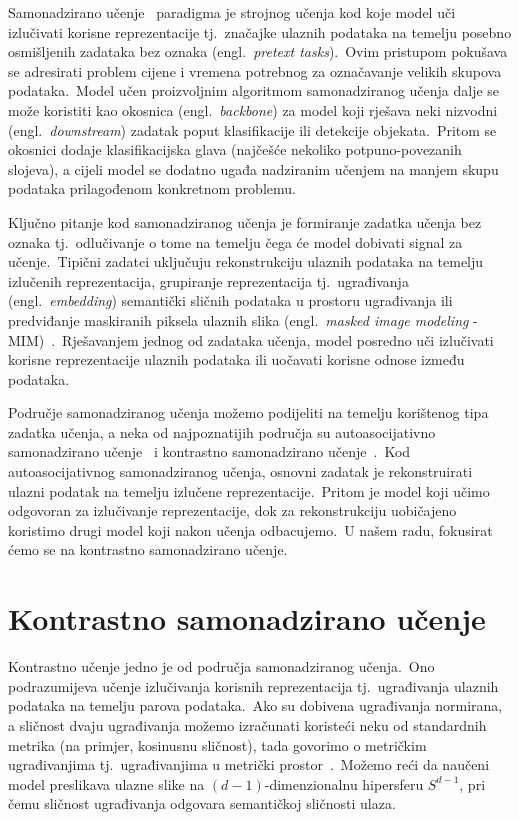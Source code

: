 \documentclass[diplomskirad]{fer}
\begin{document}
Samonadzirano učenje~\cite{jaiswal2020survey} paradigma je strojnog učenja kod koje model uči izlučivati korisne reprezentacije tj.\ značajke ulaznih podataka na temelju posebno osmišljenih zadataka bez oznaka (engl.\ \textit{pretext tasks}).\ 
Ovim pristupom pokušava se adresirati problem cijene i vremena potrebnog za označavanje velikih skupova podataka.\ 
Model učen proizvoljnim algoritmom samonadziranog učenja dalje se može koristiti kao okosnica (engl.\ \textit{backbone}) za model koji rješava neki nizvodni (engl.\ \textit{downstream}) zadatak poput klasifikacije ili detekcije objekata.\ 
Pritom se okosnici dodaje klasifikacijska glava (najčešće nekoliko potpuno-povezanih slojeva), a cijeli model se dodatno ugađa nadziranim učenjem na manjem skupu podataka prilagođenom konkretnom problemu.\ 
  
Ključno pitanje kod samonadziranog učenja je formiranje zadatka učenja bez oznaka tj.\ odlučivanje o tome na temelju čega će model dobivati signal za učenje.\ 
Tipični zadatci uključuju rekonstrukciju ulaznih podataka na temelju izlučenih reprezentacija, grupiranje reprezentacija tj.\ ugrađivanja (engl.\ \textit{embedding}) semantički sličnih podataka u prostoru ugrađivanja ili predviđanje maskiranih piksela ulaznih slika (engl.\ \textit{masked image modeling} - MIM)~\cite{hondru2024masked}.\
Rješavanjem jednog od zadataka učenja, model posredno uči izlučivati korisne reprezentacije ulaznih podataka ili uočavati korisne odnose između podataka.\ 
  
Područje samonadziranog učenja možemo podijeliti na temelju korištenog tipa zadatka učenja, a neka od najpoznatijih područja su autoasocijativno samonadzirano učenje~\cite{kramer1991nonlinear} i kontrastno samonadzirano učenje~\cite{jaiswal2020survey}.\ 
Kod autoasocijativnog samonadziranog učenja, osnovni zadatak je rekonstruirati ulazni podatak na temelju izlučene reprezentacije.\ Pritom je model koji učimo odgovoran za izlučivanje reprezentacije, dok za rekonstrukciju uobičajeno koristimo drugi model koji nakon učenja odbacujemo.\
U našem radu, fokusirat ćemo se na kontrastno samonadzirano učenje.\ 

\section{Kontrastno samonadzirano učenje}
\label{sek:kontrastno}

Kontrastno učenje jedno je od područja samonadziranog učenja.\ Ono podrazumijeva učenje izlučivanja korisnih reprezentacija tj.\ ugrađivanja ulaznih podataka na temelju parova podataka.\ 
Ako su dobivena ugrađivanja normirana, a sličnost dvaju ugrađivanja možemo izračunati koristeći neku od standardnih metrika (na primjer, kosinusnu sličnost), tada govorimo o metričkim ugrađivanjima tj.\ ugrađivanjima u metrički prostor~\cite{chavez2001searching}.\ 
Možemo reći da naučeni model preslikava ulazne slike na $(d - 1)$-dimenzionalnu hipersferu $S^{d - 1}$, pri čemu sličnost ugrađivanja odgovara semantičkoj sličnosti ulaza.\
  
\end{document}
